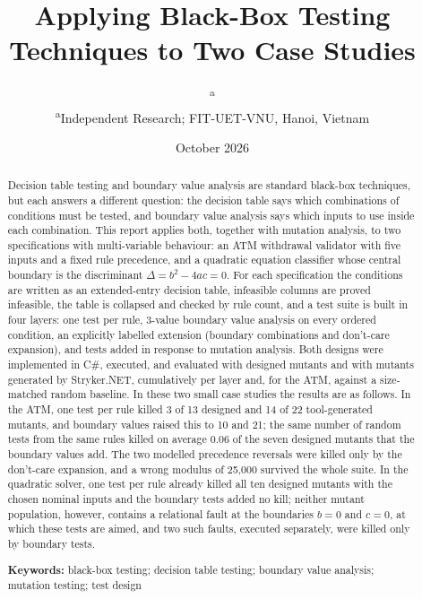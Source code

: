 \documentclass[11pt,a4paper]{article}
\title{\textbf{Applying Black-Box Testing Techniques to Two Case Studies}}
\author{
    \VN{Mai H\h{a}i Th\`anh}\textsuperscript{a}\\[0.5em]
    \small
    \textsuperscript{a}Independent Research; FIT-UET-VNU, Hanoi, Vietnam
}
\date{October 2026}
\begin{document}
\maketitle

\begin{abstract}
\noindent Decision table testing and boundary value analysis are standard
black-box techniques, but each answers a different question: the decision
table says which combinations of conditions must be tested, and boundary
value analysis says which inputs to use inside each combination. This report
applies both, together with mutation analysis, to two specifications with
multi-variable behaviour: an ATM withdrawal validator with five inputs and a
fixed rule precedence, and a quadratic equation classifier whose central
boundary is the discriminant \(\Delta=b^2-4ac=0\). For each specification the
conditions are written as an extended-entry decision table, infeasible
columns are proved infeasible, the table is collapsed and checked by rule
count, and a test suite is built in four layers: one test per rule,
3-value boundary value analysis on every ordered condition, an explicitly
labelled extension (boundary combinations and don't-care expansion), and
tests added in response to mutation analysis. Both designs were implemented
in C\#, executed, and evaluated with designed mutants and with mutants
generated by Stryker.NET, cumulatively per layer and, for the ATM, against a
size-matched random baseline. In these two small case studies the results
are as follows. In the ATM, one test per rule killed 3 of 13 designed and 14
of 22 tool-generated mutants, and boundary values raised this to 10 and 21;
the same number of random tests from the same rules killed on average 0.06
of the seven designed mutants that the boundary values add. The two modelled
precedence reversals were killed only by the don't-care expansion, and a
wrong modulus of 25{,}000 survived the whole suite. In the quadratic solver,
one test per rule already killed all ten designed mutants with the chosen
nominal inputs and the boundary tests added no kill; neither mutant
population, however, contains a relational fault at the boundaries \(b=0\) and \(c=0\), at which these tests are aimed, and two such faults, executed separately, were killed only by boundary tests.

\medskip
\noindent\textbf{Keywords:} black-box testing; decision table testing;
boundary value analysis; mutation testing; test design
\end{abstract}

\tableofcontents
\newpage
\end{document}
